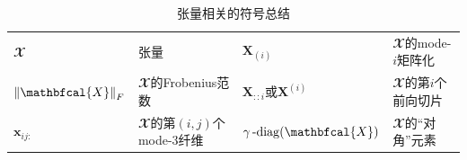 \begin{table}[!t]
\centering
\caption{张量相关的符号总结}
\label{tab:tensor-notations}
\begin{tabular}{l|l|l|l}
\hline $\mathbfcal{X}$ & 张量 &  $\boldsymbol{X}_{(i)}$ & $\mathbfcal{X}$的mode-$i$矩阵化\\
$\norm{\mathbfcal{X}}_F$ & $\mathbfcal{X}$的Frobenius范数 & $\boldsymbol{X}_{::i}$或$\boldsymbol{X}^{(i)}$ &
$\mathbfcal{X}$的第$i$个前向切片\\ $\boldsymbol{x}_{ij:}$ & $\mathbfcal{X}$的第$(i,j)$个mode-$3$纤维 & $\mydiag(\mathbfcal{X})$ & $\mathbfcal{X}$的“对角”元素 \\\hline
\end{tabular}
\end{table}





